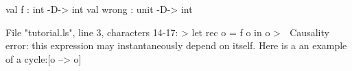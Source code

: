 \runverbatimfalse
{}
\begin{RunVerbatimMsg}
val f : int -D-> int
val wrong : unit -D-> int
\end{RunVerbatimMsg}
\begin{RunVerbatimErr}
File "tutorial.ls", line 3, characters 14-17:
>  let rec o = f o in o
>              ^^^
Causality error: this expression may instantaneously depend on itself.
Here is a an example of a cycle:[o --> o]
\end{RunVerbatimErr}
